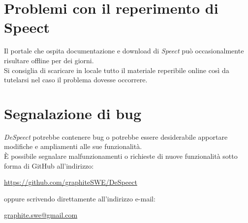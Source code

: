\documentclass[openany,12pt,a4paper]{report}
\begin{document}
	\section{Problemi con il reperimento di Speect}	
	Il portale che ospita documentazione e download di \textit{Speect} può occasionalmente risultare offline per dei giorni.\\
	Si consiglia di scaricare in locale tutto il materiale reperibile online così da tutelarsi nel caso il problema dovesse occorrere.
	
	\section{Segnalazione di bug}
	
	\textit{DeSpeect} potrebbe contenere bug o potrebbe essere desiderabile apportare modifiche e ampliamenti alle sue funzionalità. \\ È possibile segnalare malfunzionamenti o richieste di nuove funzionalità sotto forma di GitHub  all’indirizzo:
	\begin{center}
		\url{https://github.com/graphiteSWE/DeSpeect}
	\end{center}
  oppure scrivendo direttamente all'indirizzo e-mail:
  \begin{center}
  	\url{graphite.swe@gmail.com}
  \end{center}
	
	\appendix
	
	\printglossary[style=glossaryStyle, nonumberlist]
	
\end{document}
